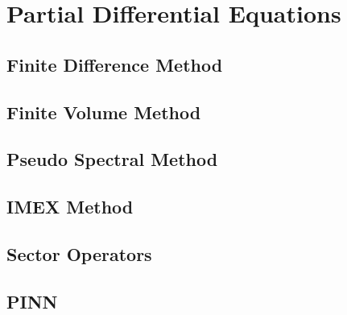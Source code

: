 \chapter{Partial Differential Equations}

\section{Finite Difference Method}


\section{Finite Volume Method}

\section{Pseudo Spectral Method}

\section{IMEX Method}

\section{Sector Operators}


\section{PINN}
